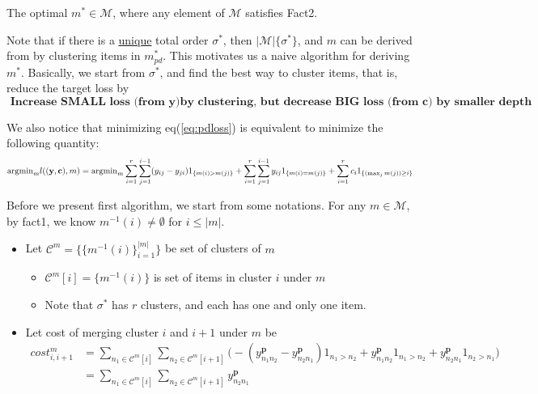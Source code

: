 \begin{lemma}
	The optimal $m^*\in\mathcal{M}$, where any element of $\mathcal{M}$ satisfies Fact2.
\end{lemma}

Note that if there is a \underline{unique} total order $\sigma^*$, then $|\mathcal{M}|\{\sigma^*\}$, and $m$ can be derived from by clustering items in $m^*_{pd}$. This motivates us a naive algorithm for deriving $m^*$. Basically, we start from $\sigma^*$, and find the best way to cluster items, that is, reduce the target loss by 
$$\textbf{ Increase SMALL loss (from $\mathbf{y}$)by clustering, but decrease BIG loss (from $\mathbf{c}$) by smaller depth }$$

We also notice that minimizing eq(\ref{eq:pdloss}) is equivalent to minimize the following quantity:
	\begin{equation}
	\text{argmin}_ml((\mathbf{y},\mathbf{c}),  m)= \text{argmin}_m\sum\limits_{i=1}^r\sum\limits_{j=1}^{i-1}(y_{ij}-y_{ji})1_{\{m(i)> m(j)\}}+\sum\limits_{i=1}^r\sum\limits_{j=1}^{i-1}y_{ij}1_{\{m(i)= m(j)\}}+\sum\limits_{i=1}^rc_i1_{\{(\max_jm(j))\geq i\}}\\
	\end{equation} 

Before we present first algorithm, we start from some notations. For any $m\in \mathcal{M}$, by fact1, we know $m^{-1}(i)\not=\emptyset$ for $i\leq |m|$. 
\begin{itemize}
	\item Let $\mathcal{C}^m=\{  \{m^{-1}(i)\}_{i=1}^{|m|}     \}$ be set of clusters of $m$
	\begin{itemize}
		\item $\mathcal{C}^m[i]= \{m^{-1}(i)\}$ is set of items in cluster $i$ under $m$
		\item Note that $\sigma^*$ has $r$ clusters, and each has one  and only one item.
	\end{itemize}
\item Let cost of merging cluster $i$ and $i+1$ under $m$ be \begin{equation}
\begin{split}
cost^m_{i, i+1}&=\sum\limits_{n_1\in \mathcal{C}^m[i]}\sum\limits_{n_2\in \mathcal{C}^m[i+1]}\bigg(-(y_{n_1n_2}^\mathbf{p}-y_{n_2n_1}^\mathbf{p})1_{n_1>n_2}+y_{n_1n_2}^\mathbf{p}1_{n_1>n_2}+y_{n_2n_1}^\mathbf{p}1_{n_2>n_1}\bigg)\\
&= \sum\limits_{n_1\in \mathcal{C}^m[i]}\sum\limits_{n_2\in \mathcal{C}^m[i+1]}y_{n_2n_1}^\mathbf{p}
\end{split}
\end{equation}
\end{itemize}

